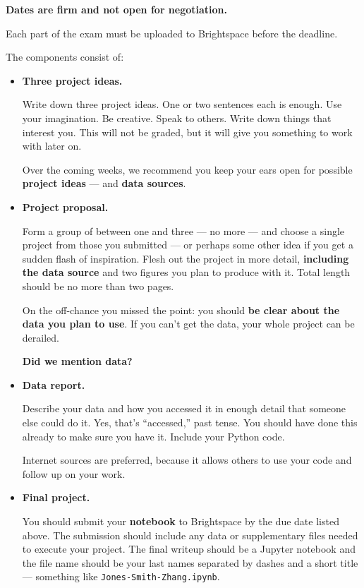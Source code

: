 \documentclass[11pt]{article}
\begin{document}
{\bf Dates are firm and not open for negotiation.}

Each part of the exam must be uploaded to Brightspace before the deadline.


The components consist of:
\begin{itemize}

\item {\bf Three project ideas.}

Write down three project ideas. One or two sentences each is enough.
Use your imagination.  Be creative.  Speak to others. Write down things that
interest you. This will not be graded, but it will give you something to work
with later on.

Over the coming weeks, we recommend you keep your ears open for possible
{\bf project ideas} --- and {\bf data sources\/}.

\item{\bf Project proposal.}

Form a group of between one and three --- no more --- and choose a single
project from those you submitted --- or perhaps some other idea if you get a
sudden flash of inspiration. Flesh out the project in more detail, {\bf
including the data source\/} and two figures you plan to produce with it. Total
length should be no more than two pages.

On the off-chance you missed the point:  you should {\bf be clear about the data
you plan to use\/}. If you can't get the data, your whole project can be
derailed.

{\bf Did we mention data?}

\item {\bf Data report.}

Describe your data and how you accessed it in enough detail that someone else
could do it. Yes, that's ``accessed,'' past tense.  You should have done this
already to make sure you have it. Include your Python code.

Internet sources are preferred, because it allows others to use your code and
follow up on your work.

\item {\bf Final project.}

You should submit your {\bf notebook\/} to Brightspace by the due date listed
above. The submission should include any data or supplementary files needed to
execute your project. The final writeup should be a Jupyter notebook and the
file name should be your last names separated by dashes and a short title ---
something like {\tt Jones-Smith-Zhang.ipynb}.


\end{itemize}
\end{document}
